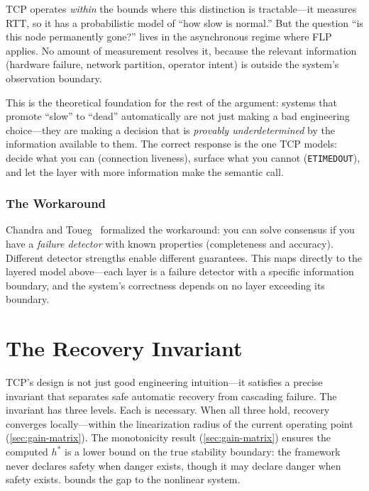 \documentclass[11pt]{article}
\begin{document}
TCP operates \emph{within} the bounds where this distinction is tractable---it
measures RTT, so it has a probabilistic model of ``how slow is normal.'' But the
question ``is this node permanently gone?'' lives in the asynchronous regime
where FLP applies. No amount of measurement resolves it, because the relevant
information (hardware failure, network partition, operator intent) is outside the
system's observation boundary.

This is the theoretical foundation for the rest of the argument: systems that
promote ``slow'' to ``dead'' automatically are not just making a bad engineering
choice---they are making a decision that is \emph{provably underdetermined} by
the information available to them. The correct response is the one TCP models:
decide what you can (connection liveness), surface what you cannot
(\texttt{ETIMEDOUT}), and let the layer with more information make the semantic
call.

\subsubsection{The Workaround}

Chandra and Toueg~\cite{chandra1996unreliable} formalized the workaround: you
can solve consensus if you have a \emph{failure detector} with known properties
(completeness and accuracy). Different detector strengths enable different
guarantees. This maps directly to the layered model above---each layer is a
failure detector with a specific information boundary, and the system's
correctness depends on no layer exceeding its boundary.

\section{The Recovery Invariant}
\label{sec:invariant}

TCP's design is not just good engineering intuition---it satisfies a precise
invariant that separates safe automatic recovery from cascading failure. The
invariant has three levels. Each is necessary. When all three hold, recovery
converges locally---within the linearization radius of the current operating
point (\cref{sec:gain-matrix}). The monotonicity result
(\cref{sec:gain-matrix}) ensures the computed $h^*$ is a lower bound on the
true stability boundary: the framework never declares safety when danger exists,
though it may declare danger when safety exists.
 bounds the gap to the nonlinear system.
\end{document}
